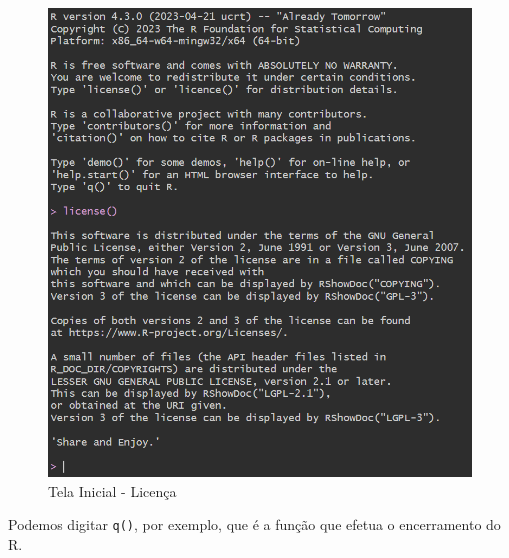 \documentclass[
  letterpaper,
  DIV=11,
  numbers=noendperiod]{scrreprt}
\begin{document}
\begin{figure}

{\centering \includegraphics{./images/r/intro/tela_inicial_licenca.png}

}

\caption{\label{fig-r-intro-tela-inicial-licenca}Tela Inicial - Licença}

\end{figure}

Podemos digitar \texttt{q()}, por exemplo, que é a função que efetua o
encerramento do R.
\end{document}
